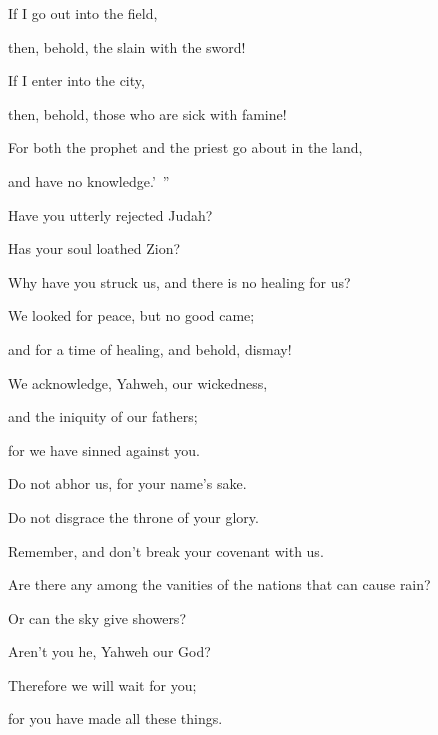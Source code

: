 {\par }{\Q {}If I go out into the field,
\par }{\QB then, behold, the slain with the sword!
\par }{\Q If I enter into the city,
\par }{\QB then, behold, those who are sick with famine!
\par }{\Q For both the prophet and the priest go about in the land,
\par }{\QB and have no knowledge.’ ”
\par }{\BB \par }{\Q {}Have you utterly rejected Judah?
\par }{\QB Has your soul loathed Zion?
\par }{\Q Why have you struck us, and there is no healing for us?
\par }{\QB We looked for peace, but no good came;
\par }{\QB and for a time of healing, and behold, dismay!
\par }{\Q {}We acknowledge, Yahweh, our wickedness,
\par }{\QB and the iniquity of our fathers;
\par }{\QB for we have sinned against you.
\par }{\Q {}Do not abhor us, for your name’s sake.
\par }{\QB Do not disgrace the throne of your glory.
\par }{\QB Remember, and don’t break your covenant with us.
\par }{\Q {}Are there any among the vanities of the nations that can cause rain?
\par }{\QB Or can the sky give showers?
\par }{\QB Aren’t you he, Yahweh our God?
\par }{\Q Therefore we will wait for you;
\par }{\QB for you have made all these things.

}
